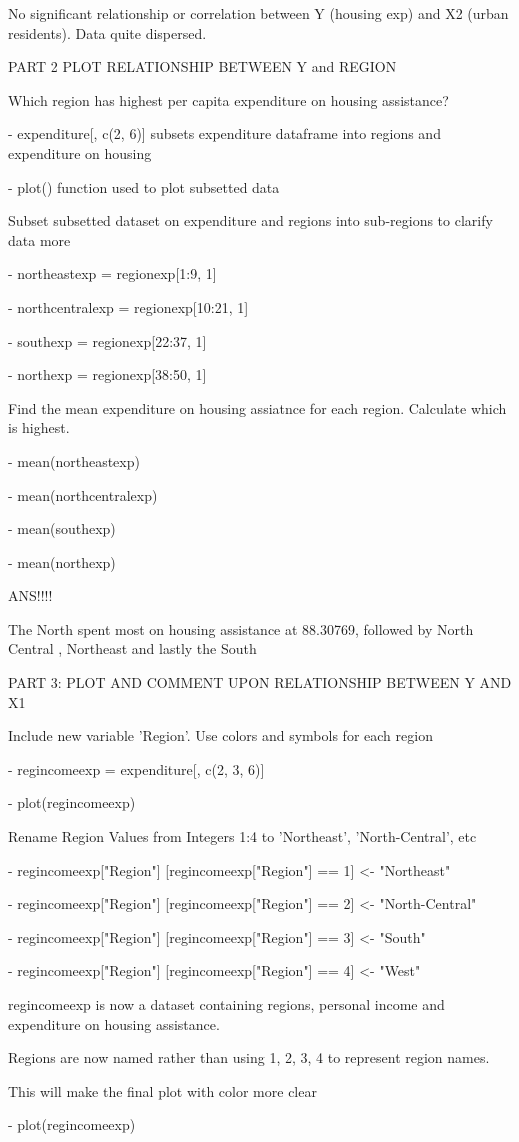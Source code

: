 \documentclass[12pt,letterpaper]{article}
\begin{document}
\begin{itemize}
No significant relationship or correlation between Y (housing exp) and X2 (urban residents). Data quite dispersed. 

PART 2 PLOT RELATIONSHIP BETWEEN  Y and REGION 

Which region has highest per capita expenditure on housing assistance?

- expenditure[, c(2, 6)] subsets expenditure dataframe into regions and expenditure on housing

- plot() function used to plot subsetted data

Subset subsetted dataset on expenditure and regions into sub-regions to clarify data more

- northeastexp = regionexp[1:9, 1]

- northcentralexp = regionexp[10:21, 1]

- southexp = regionexp[22:37, 1]

- northexp = regionexp[38:50, 1]

Find the mean expenditure on housing assiatnce for each region. Calculate which is highest.

- mean(northeastexp)

- mean(northcentralexp)

- mean(southexp)

- mean(northexp)

ANS!!!!

The North spent most on housing assistance at 88.30769, followed by North Central , Northeast  and lastly the South 

PART 3: PLOT AND COMMENT UPON RELATIONSHIP BETWEEN Y AND X1

Include new variable 'Region'. Use colors and symbols for each region

- regincomeexp =  expenditure[, c(2, 3, 6)]

- plot(regincomeexp)

Rename Region Values from Integers 1:4 to 'Northeast', 'North-Central', etc

- regincomeexp["Region"] [regincomeexp["Region"] == 1] <- "Northeast"

- regincomeexp["Region"] [regincomeexp["Region"] == 2] <- "North-Central"

- regincomeexp["Region"] [regincomeexp["Region"] == 3] <- "South"

- regincomeexp["Region"] [regincomeexp["Region"] == 4] <- "West"


regincomeexp is now a dataset containing regions, personal income and expenditure on housing assistance. 

Regions are now named rather than using 1, 2, 3, 4 to represent region names.

This will make the final plot with color more clear

- plot(regincomeexp)

\end{itemize}
\end{document}
